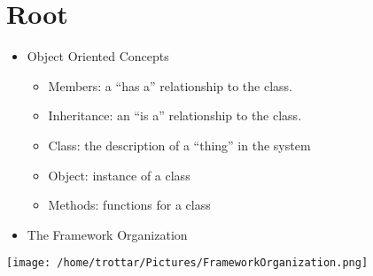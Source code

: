 \documentclass[11pt]{article}
\begin{document}
\section{Root}
\label{sec:org25f5907}
\begin{itemize}
\item Object Oriented Concepts
\begin{itemize}
\item Members: a “has a” relationship to the class.
\item Inheritance: an “is a” relationship to the class.
\item Class: the description of a “thing” in the system
\item Object: instance of a class
\item Methods: functions for a class
\end{itemize}
\item The Framework Organization
\end{itemize}
\begin{center}
\texttt{[image: /home/trottar/Pictures/FrameworkOrganization.png]}
\end{center}
\end{document}

